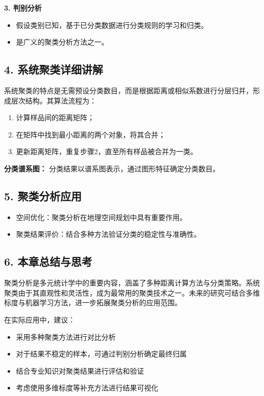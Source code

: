 \textbf{3. 判别分析}
\begin{itemize}
    \item 假设类别已知，基于已分类数据进行分类规则的学习和归类。
    \item 是广义的聚类分析方法之一。
\end{itemize}

\subsection{4. 系统聚类详细讲解}
系统聚类的特点是无需预设分类数目，而是根据距离或相似系数进行分层归并，形成层次结构。其算法流程为：
\begin{enumerate}
    \item 计算样品间的距离矩阵；
    \item 在矩阵中找到最小距离的两个对象，将其合并；
    \item 更新距离矩阵，重复步骤2，直至所有样品被合并为一类。
\end{enumerate}

\textbf{分类谱系图：} 分类结果以谱系图表示，通过图形特征确定分类数目。

\subsection{5. 聚类分析应用}
\begin{itemize}
    \item 空间优化：聚类分析在地理空间规划中具有重要作用。
    \item 聚类结果评价：结合多种方法验证分类的稳定性与准确性。
\end{itemize}

\subsection{6. 本章总结与思考}
聚类分析是多元统计学中的重要内容，涵盖了多种距离计算方法与分类策略。系统聚类由于其直观性和灵活性，成为最常用的聚类技术之一。未来的研究可结合多维标度与机器学习方法，进一步拓展聚类分析的应用范围。

在实际应用中，建议：
\begin{itemize}
    \item 采用多种聚类方法进行对比分析
    \item 对于结果不稳定的样本，可通过判别分析确定最终归属
    \item 结合专业知识对聚类结果进行评估和验证
    \item 考虑使用多维标度等补充方法进行结果可视化
\end{itemize}

